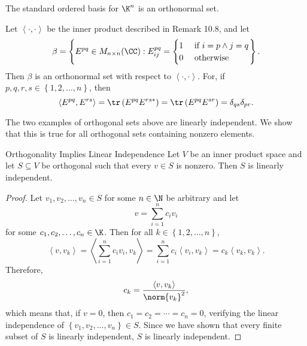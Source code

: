 \documentclass[linearalgebra]{subfiles}
\begin{document}
    \begin{example}
        The standard ordered basis for $\K^n$ is an orthonormal set.
    \end{example}

    \begin{example}
        Let $\left\langle \cdot, \cdot\right\rangle$ be the inner product described in Remark 10.8, and let
        \begin{equation*}
            \beta = \left\lbrace E^{pq}\in M_{n\times n}(\CC): E^{pq}_{ij} = \begin{cases} 1 & \text{ if } i=p\land j=q \\ 0 & \text{ otherwise }\end{cases}  \right\rbrace .
        \end{equation*}
        Then $\beta$ is an orthonormal set with respect to $\left\langle \cdot, \cdot\right\rangle$. For, if $p,q,r,s\in\left\lbrace 1,2,\ldots,n \right\rbrace$, then
        \begin{equation*}
            \left\langle E^{pq}, E^{rs}\right\rangle = \tr\left( E^{pq}E^{rs*} \right) = \tr\left( E^{pq}E^{sr} \right) = \delta_{qs}\delta_{pr}.
        \end{equation*}
    \end{example}

    \begin{remark}
        The two examples of orthogonal sets above are linearly independent. We show that this is true for all orthogonal sets containing nonzero elements.
    \end{remark}

    \begin{theorem}{Orthogonality Implies Linear Independence}
        Let $V$ be an inner product space and let $S\subseteq V$ be orthogonal such that every $v\in S$ is nonzero. Then $S$ is linearly independent.
    \end{theorem}

    \begin{proof}
        Let $v_1,v_2,\ldots,v_n\in S$ for some $n\in\N$ be arbitrary and let
        \begin{equation*}
            v = \sum^{n}_{i=1} c_iv_i
        \end{equation*}
        for some $c_1,c_2,\ldots,c_n\in\K$. Then for all $k\in\left\lbrace 1,2,\ldots,n \right\rbrace$,
        \begin{equation*}
            \left\langle v, v_k\right\rangle = \left\langle \sum^{n}_{i=1} c_iv_i, v_k\right\rangle = \sum^{n}_{i=1} c_i\left\langle v_i,v_k \right\rangle = c_k\left\langle v_k, v_k\right\rangle.
        \end{equation*}
        Therefore,
        \begin{equation*}
            c_k = \frac{\left\langle v, v_k\right\rangle }{\norm{v_k}^2},
        \end{equation*}
        which means that, if $v=0$, then $c_1=c_2=\cdots=c_n=0$, verifying the linear independence of $\left\lbrace v_1,v_2,\ldots,v_n \right\rbrace \in S$. Since we have shown that every finite subset of $S$ is linearly independent, $S$ is linearly independent.
    \end{proof}
\end{document}
